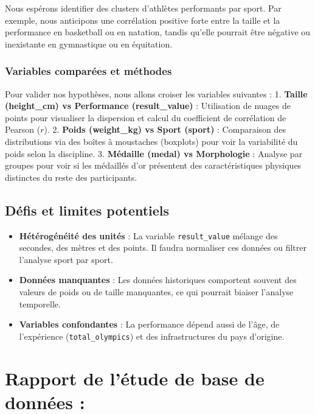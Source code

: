\documentclass[
]{article}
\providecommand{\tightlist}{%
  \setlength{\itemsep}{0pt}\setlength{\parskip}{0pt}}
\begin{document}
Nous espérons identifier des clusters d'athlètes performants par sport.
Par exemple, nous anticipons une corrélation positive forte entre la
taille et la performance en basketball ou en natation, tandis qu'elle
pourrait être négative ou inexistante en gymnastique ou en équitation.

\subsubsection{Variables comparées et
méthodes}\label{variables-comparuxe9es-et-muxe9thodes}

Pour valider nos hypothèses, nous allons croiser les variables suivantes
: 1. \textbf{Taille (height\_cm) vs Performance (result\_value)} :
Utilisation de nuages de points pour visualiser la dispersion et calcul
du coefficient de corrélation de Pearson (\(r\)). 2. \textbf{Poids
(weight\_kg) vs Sport (sport)} : Comparaison des distributions via des
boîtes à moustaches (boxplots) pour voir la variabilité du poids selon
la discipline. 3. \textbf{Médaille (medal) vs Morphologie} : Analyse par
groupes pour voir si les médaillés d'or présentent des caractéristiques
physiques distinctes du reste des participants.

\subsection{Défis et limites
potentiels}\label{duxe9fis-et-limites-potentiels}

\begin{itemize}
\tightlist
\item
  \textbf{Hétérogénéité des unités} : La variable \texttt{result\_value}
  mélange des secondes, des mètres et des points. Il faudra normaliser
  ces données ou filtrer l'analyse sport par sport.
\item
  \textbf{Données manquantes} : Les données historiques comportent
  souvent des valeurs de poids ou de taille manquantes, ce qui pourrait
  biaiser l'analyse temporelle.
\item
  \textbf{Variables confondantes} : La performance dépend aussi de
  l'âge, de l'expérience (\texttt{total\_olympics}) et des
  infrastructures du pays d'origine.
\end{itemize}

\section{Rapport de l'étude de base de données
:}\label{rapport-de-luxe9tude-de-base-de-donnuxe9es}
\end{document}
